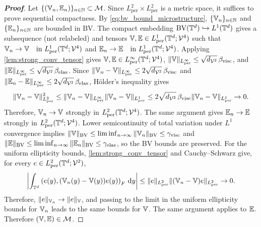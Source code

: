 \begin{proof}[\bf Proof]
Let $\{(\mathbb{V}_n,\mathbb{E}_n)\}_{n\in\mathbb{N}}\subset {\mathcal{M}}$. Since $L^2_{\mathrm{per}}\times L^2_{\mathrm{per}}$ is a metric space, it suffices to prove sequential compactness. By \cref{eq:bv_bound_microstructure}, $\{\mathbb{V}_n\}_{n\in\mathbb{N}}$ and $\{\mathbb{E}_n\}_{n\in\mathbb{N}}$ are bounded in $\mathrm{BV}$. The compact embedding $\mathrm{BV}(\mathbb{T}^d)\hookrightarrow L^1(\mathbb{T}^d)$ gives a subsequence (not relabeled) and tensors $\mathbb{V},\mathbb{E}\in L^1_{\mathrm{per}}(\mathbb{T}^d;{\mathcal{V}}^{4})$ such that
$ \mathbb{V}_n \to \mathbb{V} \quad\text{in }L^1_{\mathrm{per}}(\mathbb{T}^d;{\mathcal{V}}^{4})$ and $\mathbb{E}_n \to \mathbb{E} \quad\text{in }L^1_{\mathrm{per}}(\mathbb{T}^d;{\mathcal{V}}^{4})$. Applying \cref{lem:strong_conv_tensor} gives $\mathbb{V},\mathbb{E}\in L^\infty_{\mathrm{per}}(\mathbb{T}^d;{\mathcal{V}}^4)$, $\|\mathbb{V}\|_{L^\infty_{\mathrm{per}}}\le \sqrt{d_{{\mathcal{V}}^2}}\,\beta_{\rm visc}$, and $\|\mathbb{E}\|_{L^\infty_{\mathrm{per}}}\le \sqrt{d_{{\mathcal{V}}^2}}\,\beta_{\rm elas}$. Since $\|\mathbb{V}_n-\mathbb{V}\|_{L^\infty_{\mathrm{per}}}\le 2\sqrt{d_{{\mathcal{V}}^2}}\,\beta_{\rm visc}$ and $\|\mathbb{E}_n-\mathbb{E}\|_{L^\infty_{\mathrm{per}}}\le 2\sqrt{d_{{\mathcal{V}}^2}}\,\beta_{\rm elas}$, H\"older's inequality gives
\begin{equation*}
    \|\mathbb{V}_n-\mathbb{V}\|_{L^2_{\mathrm{per}}}^2
\leq \|\mathbb{V}_n-\mathbb{V}\|_{L^\infty_{\mathrm{per}}}\|\mathbb{V}_n-\mathbb{V}\|_{L^1_{\mathrm{per}}}
    \le 2\sqrt{d_{{\mathcal{V}}^2}}\,\beta_{\rm visc}\|\mathbb{V}_n-\mathbb{V}\|_{L^1_{\mathrm{per}}}\to 0.
\end{equation*}
Therefore, $\mathbb{V}_n\to \mathbb{V}$ strongly in $L^2_{\mathrm{per}}(\mathbb{T}^d;{\mathcal{V}}^{4})$. The same argument gives $\mathbb{E}_n\to \mathbb{E}$ strongly in $L^2_{\mathrm{per}}(\mathbb{T}^d;{\mathcal{V}}^{4})$. Lower semicontinuity of total variation under $L^1$ convergence implies $\|\mathbb{V}\|_{\mathrm{BV}}\le \liminf_{n\to\infty}\|\mathbb{V}_n\|_{\mathrm{BV}}\leq \gamma_{\rm visc}$ and $\|\mathbb{E}\|_{\mathrm{BV}}\le \liminf_{n\to\infty}\|\mathbb{E}_n\|_{\mathrm{BV}}\leq \gamma_{\rm elas}$, so the BV bounds are preserved. For the uniform ellipticity bounds, \cref{lem:strong_conv_tensor} and Cauchy--Schwarz give, for every $e\in L^2_{\mathrm{per}}(\mathbb{T}^d;{\mathcal{V}}^2)$,
\begin{equation*}
    \left|\int_{\mathbb{T}^d} \left(e(y),(\mathbb{V}_n(y)-\mathbb{V}(y))e(y)\right)_F\,\mathrm{d}y\right| \le \|e\|_{L^2_{\mathrm{per}}}\|(\mathbb{V}_n-\mathbb{V})e\|_{L^2_{\mathrm{per}}} \to 0.
\end{equation*}
Therefore, $\|e\|_{\mathbb{V}_n}\to \|e\|_{\mathbb{V}}$, and passing to the limit in the uniform ellipticity bounds for $\mathbb{V}_n$ leads to the same bounds for $\mathbb{V}$. The same argument applies to $\mathbb{E}$. Therefore $(\mathbb{V},\mathbb{E})\in {\mathcal{M}}$.
\end{proof}

